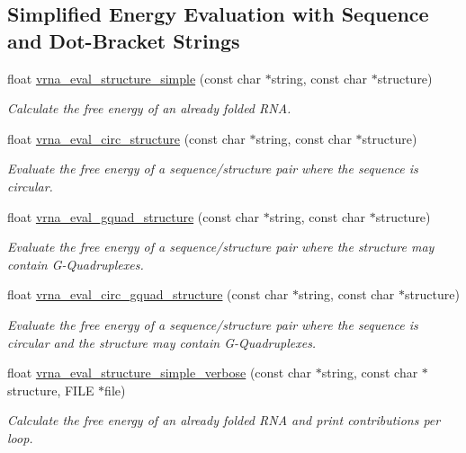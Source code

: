 \subsection*{Simplified Energy Evaluation with Sequence and Dot-\/\+Bracket Strings}
\begin{DoxyCompactItemize}
\item 
float \hyperlink{group__eval_ga7e5273464b775d4130245681312c1369}{vrna\+\_\+eval\+\_\+structure\+\_\+simple} (const char $\ast$string, const char $\ast$structure)
\begin{DoxyCompactList}\small\item\em Calculate the free energy of an already folded R\+NA. \end{DoxyCompactList}\item 
float \hyperlink{group__eval_ga3e05a23ddf9b083f4e69881e440d4866}{vrna\+\_\+eval\+\_\+circ\+\_\+structure} (const char $\ast$string, const char $\ast$structure)
\begin{DoxyCompactList}\small\item\em Evaluate the free energy of a sequence/structure pair where the sequence is circular. \end{DoxyCompactList}\item 
float \hyperlink{group__eval_ga3263504825ef4b523eba797c99921df4}{vrna\+\_\+eval\+\_\+gquad\+\_\+structure} (const char $\ast$string, const char $\ast$structure)
\begin{DoxyCompactList}\small\item\em Evaluate the free energy of a sequence/structure pair where the structure may contain G-\/\+Quadruplexes. \end{DoxyCompactList}\item 
float \hyperlink{group__eval_ga9dba2fc5d7e6ad1359a7c2f350589c0e}{vrna\+\_\+eval\+\_\+circ\+\_\+gquad\+\_\+structure} (const char $\ast$string, const char $\ast$structure)
\begin{DoxyCompactList}\small\item\em Evaluate the free energy of a sequence/structure pair where the sequence is circular and the structure may contain G-\/\+Quadruplexes. \end{DoxyCompactList}\item 
float \hyperlink{group__eval_gaf928bfd96767e1b8033a95a4cc432e39}{vrna\+\_\+eval\+\_\+structure\+\_\+simple\+\_\+verbose} (const char $\ast$string, const char $\ast$structure, F\+I\+LE $\ast$file)
\begin{DoxyCompactList}\small\item\em Calculate the free energy of an already folded R\+NA and print contributions per loop. \end{DoxyCompactList}\item 

\end{DoxyCompactItemize}
